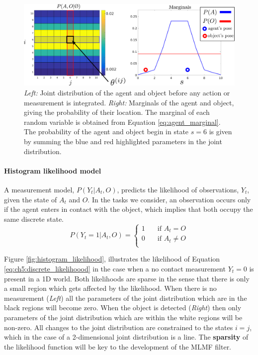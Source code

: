 \begin{figure}
 \centering
 \includegraphics[width=\textwidth]{./ch5-MLMF/Figures/explenation/hist_SLAM.pdf}
 \caption{\textit{Left:} Joint distribution of the agent and object before any action or measurement is integrated. 
 \textit{Right:} Marginals of the agent and object, giving the probability of their location. The marginal of each 
 random variable is obtained from Equation \ref{eq:agent_marginal}. The probability of
 the agent and object begin in state $s=6$ is given by summing the blue and red highlighted parameters in the joint distribution. }
 \label{fig:histogram_joint}
\end{figure}

\paragraph{Histogram likelihood model}

A measurement model, $P(Y_t|A_t,O)$, predicts the likelihood of observations, $Y_t$, given the state of $A_t$ and $O$. 
In the tasks we consider, an observation occurs only if the agent enters in contact with the object, which implies that both
occupy the same discrete state. 
\begin{equation} \label{eq:ch5:discrete_likelihoood}
P(Y_t=1|A_t,O) =
  \begin{cases}
    1       & \quad \text{if } A_t = O     \\
    0  	    & \quad \text{if } A_t \not= O \\
  \end{cases}
\end{equation}

Figure \ref{fig:histogram_likelihood}, illustrates the likelihood of Equation \ref{eq:ch5:discrete_likelihoood} 
in the case when a no contact measurement $Y_t=0$ is present in a 1D world. Both likelihoods are sparse in the sense that there is only a small 
region which gets affected by the likelihood. When there is no measurement (\textit{Left}) all the parameters of the 
joint distribution which are in the black regions will become zero. When the object is detected (\textit{Right}) then 
only parameters of the joint distribution which are within the white regions will be non-zero. All changes
to the joint distribution are constrained to the states $i = j$, which in the case of a 2-dimensional joint 
distribution is a line. The \textbf{sparsity} of the likelihood function  will be key to the development of the MLMF filter.

